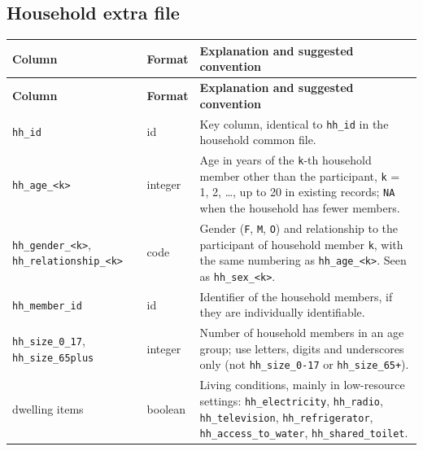 \documentclass[11pt,a4paper]{article}
\begin{document}
\subsection*{Household extra file}
{\footnotesize
\begin{longtable}{p{3.4cm} p{1.8cm} p{8.2cm}}
\toprule
\textbf{Column} & \textbf{Format} & \textbf{Explanation and suggested convention} \\
\midrule
\endfirsthead
\toprule
\textbf{Column} & \textbf{Format} & \textbf{Explanation and suggested convention} \\
\midrule
\endhead
\bottomrule
\endfoot
    \texttt{hh\_\allowbreak{}id} & id & Key column, identical to \texttt{hh\_\allowbreak{}id} in the household common file. \\
    \texttt{hh\_\allowbreak{}age\_\allowbreak{}<k>} & integer & Age in years of the \texttt{k}-th household member other than the participant, \texttt{k} = 1, 2, \ldots, up to 20 in existing records; \texttt{NA} when the household has fewer members. \\
    \texttt{hh\_\allowbreak{}gender\_\allowbreak{}<k>}, \texttt{hh\_\allowbreak{}relationship\_\allowbreak{}<k>} & code & Gender (\texttt{F}, \texttt{M}, \texttt{O}) and relationship to the participant of household member \texttt{k}, with the same numbering as \texttt{hh\_\allowbreak{}age\_\allowbreak{}<k>}. Seen as \texttt{hh\_\allowbreak{}sex\_\allowbreak{}<k>}. \\
    \texttt{hh\_\allowbreak{}member\_\allowbreak{}id} & id & Identifier of the household members, if they are individually identifiable. \\
    \texttt{hh\_\allowbreak{}size\_\allowbreak{}0\_\allowbreak{}17}, \texttt{hh\_\allowbreak{}size\_\allowbreak{}65plus} & integer & Number of household members in an age group; use letters, digits and underscores only (not \texttt{hh\_\allowbreak{}size\_\allowbreak{}0-17} or \texttt{hh\_\allowbreak{}size\_\allowbreak{}65+}). \\
    dwelling items & boolean & Living conditions, mainly in low-resource settings: \texttt{hh\_\allowbreak{}electricity}, \texttt{hh\_\allowbreak{}radio}, \texttt{hh\_\allowbreak{}television}, \texttt{hh\_\allowbreak{}refrigerator}, \texttt{hh\_\allowbreak{}access\_\allowbreak{}to\_\allowbreak{}water}, \texttt{hh\_\allowbreak{}shared\_\allowbreak{}toilet}. \\
\end{longtable}
}
\end{document}
